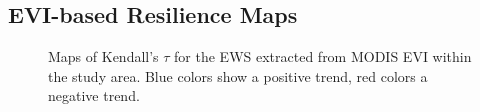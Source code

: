 \subsection{EVI-based Resilience Maps}
\begin{figure}[htpb]
	\caption{Maps of Kendall's $ \tau $ for the EWS extracted from MODIS EVI within the study area. Blue colors show a positive trend, red colors a negative trend.}\label{res:eviacf1}
\end{figure}	

